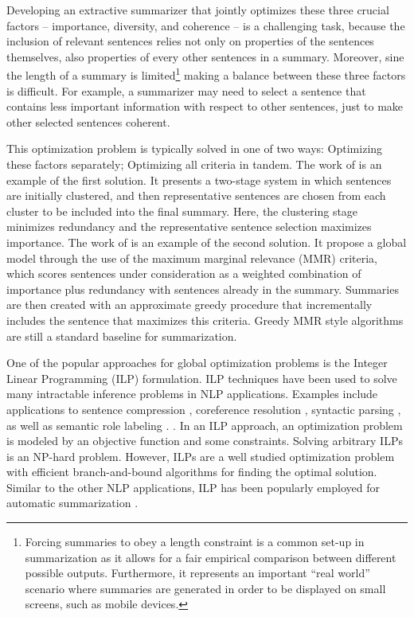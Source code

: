 Developing an extractive summarizer that jointly optimizes these three crucial factors -- importance, diversity, and coherence -- is a challenging task, because the inclusion of relevant sentences relies not only on properties of the sentences themselves, also properties of every other sentences in a summary. 
Moreover, sine the length of a summary is limited\footnote{Forcing summaries to obey a length constraint is a common set-up in summarization as it allows for a fair empirical comparison between different possible outputs. 
 Furthermore, it represents an important ``real world'' scenario where summaries are generated in order to be displayed on small screens, such as mobile devices.
} making a balance between these three factors is difficult. 
For example, a summarizer may need to select a sentence that contains less important information with respect to other sentences, just to make other selected sentences coherent. 

This optimization problem is typically solved in one of two ways:  Optimizing these factors separately; Optimizing all criteria in tandem. 
The work of \cite{mckeown99} is an example of the first solution. 
It presents a \mbox{two-stage} system in which sentences are initially clustered, and then representative sentences are chosen from each cluster to be included into the final summary. 
Here, the clustering stage minimizes redundancy and the representative sentence selection maximizes importance.
The work of \cite{carbonell98} is an example of the second solution.  
It propose a global model through the use of the maximum marginal relevance (MMR) criteria, which scores sentences under consideration as a weighted combination of importance plus redundancy with sentences already in the summary. 
Summaries are then created with an approximate greedy procedure that incrementally includes the sentence that maximizes this criteria. Greedy MMR style algorithms are still a standard baseline for summarization. 

One of the popular approaches for global optimization problems is the Integer Linear Programming (ILP) formulation. 
ILP techniques have been used to solve many intractable inference problems in NLP applications. 
Examples include applications to sentence compression \cite{clarke10,filippova13}, coreference resolution \cite{denis09},  syntactic parsing \cite{klenner07a}, as well as semantic role labeling \cite{punyakanok04b}.
\cite{marciniak05b,mcdonald07,bergkirkpatrick11,woodsend12,lichen13a,hirao13}.
In an ILP approach, an optimization problem is modeled by an objective function and some constraints. 
Solving arbitrary ILPs is an \mbox{NP-hard} problem. 
However, ILPs are a well studied optimization problem with efficient \mbox{branch-and-bound} algorithms for finding the optimal solution. 
Similar to the other NLP applications, ILP has been popularly employed for automatic summarization 
\cite{marciniak05b,mcdonald07,bergkirkpatrick11,woodsend12,lichen13a,hirao13}.  

